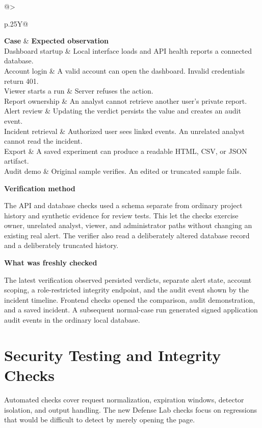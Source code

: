 \documentclass[11pt,a4paper,oneside]{report}
\makeatletter
\newcommand{\topic}[1]{\smallskip\noindent\textbf{#1}\par\nobreak\vspace{-.39em}}
\newcommand{\sheet}[1]{\clearpage\section{#1}}
\newcommand{\tabletitle}[1]{\captionof{table}{#1}\smallskip}
\newcommand{\bodytable}[1]{\begin{tabularx}{\linewidth}{@{}>{\raggedright\arraybackslash}p{.25\linewidth}Y@{}}\toprule #1\bottomrule\end{tabularx}}
\makeatother
\begin{document}
\tabletitle{Functional acceptance cases}
\bodytable{\textbf{Case} & \textbf{Expected observation}\\\midrule
Dashboard startup & Local interface loads and API health reports a connected database.\\
Account login & A valid account can open the dashboard. Invalid credentials return 401.\\
Viewer starts a run & Server refuses the action.\\
Report ownership & An analyst cannot retrieve another user's private report.\\
Alert review & Updating the verdict persists the value and creates an audit event.\\
Incident retrieval & Authorized user sees linked events. An unrelated analyst cannot read the incident.\\
Export & A saved experiment can produce a readable HTML, CSV, or JSON artifact.\\
Audit demo & Original sample verifies. An edited or truncated sample fails.\\}

\topic{Verification method}
The API and database checks used a schema separate from ordinary project history and synthetic evidence for review tests. This let the checks exercise owner, unrelated analyst, viewer, and administrator paths without changing an existing real alert. The verifier also read a deliberately altered database record and a deliberately truncated history.

\topic{What was freshly checked}
The latest verification observed persisted verdicts, separate alert state, account scoping, a role-restricted integrity endpoint, and the audit event shown by the incident timeline. Frontend checks opened the comparison, audit demonstration, and a saved incident. A subsequent normal-case run generated signed application audit events in the ordinary local database.

\sheet{Security Testing and Integrity Checks}
Automated checks cover request normalization, expiration windows, detector isolation, and output handling. The new Defense Lab checks focus on regressions that would be difficult to detect by merely opening the page.
\end{document}
